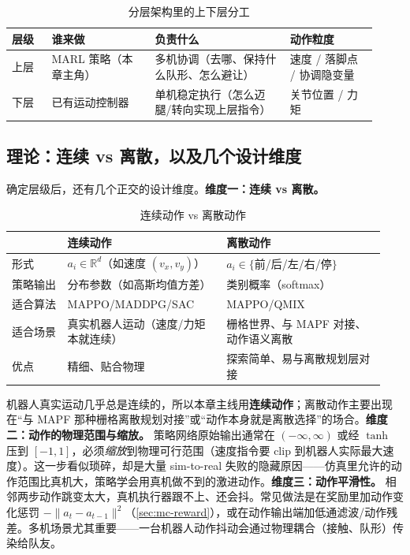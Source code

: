 \begin{table}[H]\centering\small
\caption{分层架构里的上下层分工}
\label{tab:mc-hierarchy}
\begin{tabular}{p{0.10\linewidth}p{0.26\linewidth}p{0.34\linewidth}p{0.22\linewidth}}
\toprule
层级 & 谁来做 & 负责什么 & 动作粒度 \\
\midrule
上层 & MARL 策略（本章主角） & 多机协调（去哪、保持什么队形、怎么避让） & 速度 / 落脚点 / 协调隐变量 \\
下层 & 已有运动控制器 & 单机稳定执行（怎么迈腿/转向实现上层指令） & 关节位置 / 力矩 \\
\bottomrule
\end{tabular}
\end{table}

\subsection{理论：连续 vs 离散，以及几个设计维度}
\label{sec:mc-action-dims}

确定层级后，还有几个正交的设计维度。\textbf{维度一：连续 vs 离散。}

\begin{table}[H]\centering\small
\caption{连续动作 vs 离散动作}
\label{tab:mc-cont-disc}
\begin{tabular}{p{0.14\linewidth}p{0.40\linewidth}p{0.40\linewidth}}
\toprule
 & 连续动作 & 离散动作 \\
\midrule
形式 & $a_i\in\mathbb{R}^d$（如速度 $(v_x,v_y)$） & $a_i\in\{$前/后/左/右/停$\}$ \\
策略输出 & 分布参数（如高斯均值方差） & 类别概率（softmax） \\
适合算法 & MAPPO/MADDPG/SAC & MAPPO/QMIX \\
适合场景 & 真实机器人运动（速度/力矩本就连续） & 栅格世界、与 MAPF 对接、动作语义离散 \\
优点 & 精细、贴合物理 & 探索简单、易与离散规划层对接 \\
\bottomrule
\end{tabular}
\end{table}

\noindent 机器人真实运动几乎总是连续的，所以本章主线用\textbf{连续动作}；离散动作主要出现在“与 MAPF 那种栅格离散规划对接”或“动作本身就是离散选择”的场合。\textbf{维度二：动作的物理范围与缩放。} 策略网络原始输出通常在 $(-\infty,\infty)$ 或经 $\tanh$ 压到 $[-1,1]$，必须\emph{缩放}到物理可行范围（速度指令要 clip 到机器人实际最大速度）。这一步看似琐碎，却是大量 sim-to-real 失败的隐藏原因——仿真里允许的动作范围比真机大，策略学会用真机做不到的激进动作。\textbf{维度三：动作平滑性。} 相邻两步动作跳变太大，真机执行器跟不上、还会抖。常见做法是在奖励里加动作变化惩罚 $-\|a_t-a_{t-1}\|^2$（\cref{sec:mc-reward}），或在动作输出端加低通滤波/动作残差。多机场景尤其重要——一台机器人动作抖动会通过物理耦合（接触、队形）传染给队友。

